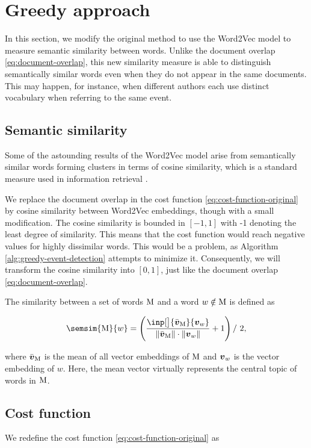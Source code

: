 \section{Greedy approach}
In this section, we modify the original method to use the Word2Vec model to measure semantic similarity between words. Unlike the document overlap \eqref{eq:document-overlap}, this new similarity measure is able to distinguish semantically similar words even when they do not appear in the same documents. This may happen, for instance, when different authors each use distinct vocabulary when referring to the same event.


\subsection{Semantic similarity}
Some of the astounding results of the Word2Vec model arise from semantically similar words forming clusters \citep{linguistic-regularities} in terms of cosine similarity, which is a standard measure used in information retrieval \citep{information-retrieval, cosine-similarity}.

We replace the document overlap in the cost function \eqref{eq:cost-function-original} by cosine similarity between Word2Vec embeddings, though with a small modification. The cosine similarity is bounded in $[-1, 1]$ with -1 denoting the least degree of similarity. This means that the cost function would reach negative values for highly dissimilar words. This would be a problem, as Algorithm \ref{alg:greedy-event-detection} attempts to minimize it. Consequently, we will transform the cosine similarity into $[0, 1]$, just like the document overlap \eqref{eq:document-overlap}.

The similarity between a set of words $\text{M}$ and a word $w \notin \text{M}$ is defined as

\begin{equation}
	\semsim{\featset}{w} = \left( \frac{\inp[\big]{\bar{\embed}_{\featset}}{\embed_{w}}}{\| \bar{\embed}_{\featset} \| \cdot \| \embed_{w} \|} + 1 \right) /\ 2,
\end{equation}

where $\bar{\embed}_{\featset}$ is the mean of all vector embeddings of $\text{M}$ and $\embed_{w}$ is the vector embedding of $w$. Here, the mean vector virtually represents the central topic of words in $\text{M}$.


\subsection{Cost function}
We redefine the cost function \eqref{eq:cost-function-original} as

